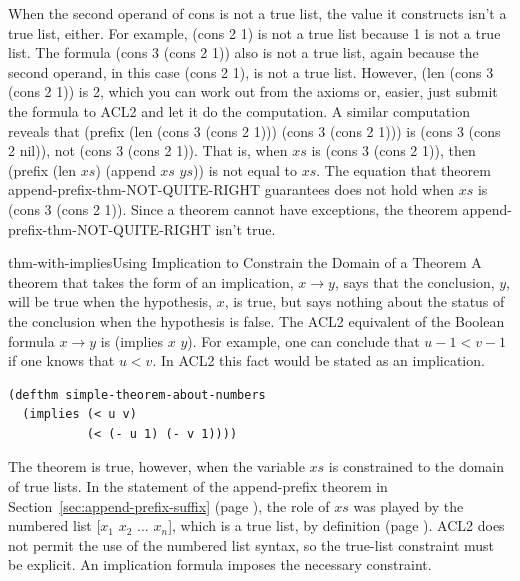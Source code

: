 When the second operand of \textsf{cons} is not a true list,
the value it constructs isn't a true list, either.
For example, \textsf{(cons 2 1)} is not a true list because 1 is not a true list.
The formula \textsf{(cons 3 (cons 2 1))} also is not a true list,
again because the second operand,
in this case \textsf{(cons 2 1)}, is not a true list.
However, \textsf{(len (cons 3 (cons 2 1))} is \textsf{2}, which you can work
out from the axioms or, easier,
just submit the formula to ACL2 and let it do the computation.
A similar computation reveals that
\textsf{(prefix (len (cons 3 (cons 2 1))) (cons 3 (cons 2 1)))}
is \textsf{(cons 3 (cons 2 nil))}, not \textsf{(cons 3 (cons 2 1))}.
That is, when $xs$ is \textsf{(cons 3 (cons 2 1))},
then \textsf{(prefix (len $xs$) (append $xs$ $ys$))} is not equal to $xs$.
The equation that theorem append-prefix-thm-NOT-QUITE-RIGHT
guarantees does not hold when $xs$ is \textsf{(cons 3 (cons 2 1))}.
Since a theorem cannot have exceptions,
the theorem append-prefix-thm-NOT-QUITE-RIGHT
isn't true.

\begin{aside}{thm-with-implies}{Using Implication to Constrain the Domain of a Theorem}
A theorem that takes the form of an implication, $x \rightarrow y$,
says that the conclusion, $y$, will be true when the hypothesis, $x$,
is true, but says nothing about the status of the conclusion when
the hypothesis is false. The ACL2 equivalent of the Boolean formula $x \rightarrow y$
is \textsf{(implies $x$ $y$)}.
For example, one can conclude that $u - 1 < v - 1$
if one knows that $u < v$.
In ACL2 this fact would be stated as an implication.
\begin{code}
\begin{verbatim}
(defthm simple-theorem-about-numbers
  (implies (< u v)
           (< (- u 1) (- v 1))))
\end{verbatim}
\end{code}
\end{aside}

The theorem is true, however, when the variable $xs$ is
constrained to the domain of true lists.
In the statement of the append-prefix theorem in
Section~\ref{sec:append-prefix-suffix} (page \pageref{append-prefix-thm-predicate}),
the role of $xs$ was played by the numbered list
\textsf{[$x_1$ $x_2$ $\dots$ $x_n$]},
which is a true list, by definition
(page \pageref{numbered-list-interpretation}).
ACL2 does not permit the use of the numbered list syntax,
so the true-list constraint must be explicit.
An implication formula imposes the necessary constraint.

